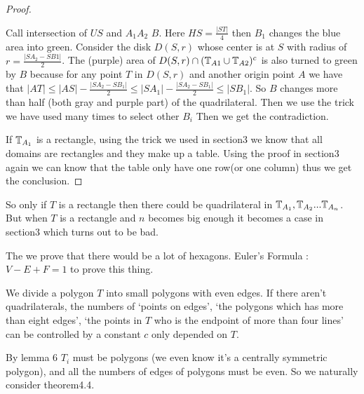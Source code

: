 \begin{proof}
\begin{center}
\end{center}
		
	Call intersection of $US$ and $A_1A_2$ $B$. Here $HS = \frac{|ST|}{4}$ 
	then $B_1$ changes the blue area into green. Consider the disk $D(S,r)$ 
	whose center is at $S$ with radius of $r = \frac{|SA_2-SB1|}{2}$. 
	The (purple) area of $D(S,r) \cap (\mathbb{T}_{A1} \cup \mathbb{T}_{A2})^c$ 
	is also turned to green by $B$ because for any point $T$ in $D(S,r)$ and
	another origin point $A$ we have that $|AT|\leq
	|AS|-\frac{|SA_2 - SB_1|}{2} \leq |SA_1| - \frac{|SA_2 - SB_1|}{2} 
	\leq |SB_1|$. So $B$ changes more than half (both gray and purple 
	part) of the quadrilateral. Then we use the trick we have used many 
	times to select other $B_i$ Then we get the contradiction.
		
	If $\mathbb{T}_{A_1}$ is a rectangle, using the trick we used in section3 
	we know that all domains are rectangles and they make up a table. 
	Using the proof in section3 again we can know that the table only 
	have one row(or one column) thus we get the conclusion.
	\end{proof}
	
So only if $T$ is a rectangle then there could be quadrilateral 
in $\mathbb{T}_{A_1}, \mathbb{T}_{A_2} ... \mathbb{T}_{A_n}$. But when $T$ is a rectangle 
and $n$ becomes big enough it becomes a case in section3 which turns 
out to be bad. 
	
The we prove that there would be a lot of hexagons. Euler's Formula 
: $V-E+F=1$ to prove this thing.
	
\begin{thm}
	We divide a polygon $T$ into small polygons with even edges. 
	If there aren't quadrilaterals, the numbers of `points on edges', 
	`the polygons which has more than eight edges', `the points in $T$ 
	who is the endpoint of more than four lines' can be controlled 
	by a constant $c$ only depended on $T$.
\end{thm}
	
\begin{rem}
	By lemma 6 $T_i$ must be polygons (we even know it's a centrally 
	symmetric polygon), and all the numbers of edges of polygons must
	be even. So we naturally consider theorem4.4. 
\end{rem}
	
